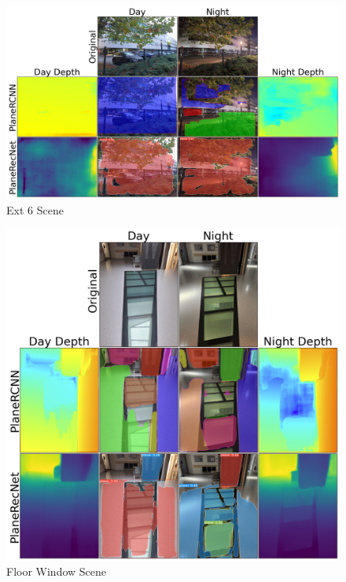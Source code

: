 \begin{figure}[H]
    \centering
    \includegraphics[width=1.0\textwidth]{images/results/Ext_6.png}
    \caption{Ext 6 Scene}
    \label{figure:Ext_6}
\end{figure}

\begin{figure}[H]
    \centering
    \includegraphics[width=1.0\textwidth]{images/results/FloorWindow.png}
    \caption{Floor Window Scene}
    \label{figure:FloorWindow}
\end{figure}

